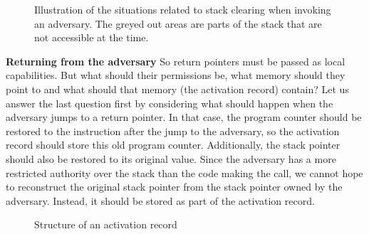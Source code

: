 \documentclass[format=acmsmall, review=true, screen=true]{acmart}
\newcommand{\plainperm}[1]{\textsc{#1}}
\newcommand{\entry}{\plainperm{e}}
\begin{document}
\begin{figure}[htb]
\begin{subfigure}{0.333\linewidth}
  \caption{}
  \label{fig:illu-adv-called}
  \end{subfigure}
  \caption{Illustration of the situations related to stack clearing when invoking an adversary.
    The greyed out areas are parts of the stack that are not accessible at the time.
  }
  \label{fig:invoke-adv}
\end{figure}


\textbf{Returning from the adversary} So return pointers must be passed as local
capabilities. But what should their permissions be, what memory should they
point to and what should that memory (the activation record) contain? Let us
answer the last question first by considering what should happen when the
adversary jumps to a return pointer. In that case, the program counter should be
restored to the instruction after the jump to the adversary, so the activation
record should store this old program counter. Additionally, the stack pointer
should also be restored to its original value. Since the adversary has a more
restricted authority over the stack than the code making the call, we cannot
hope to reconstruct the original stack pointer from the stack pointer owned by the
adversary. Instead, it should be stored as part of the activation record.

\begin{figure}[htb]
  
  \caption{Structure of an activation record}
  \label{fig:activ-rec-struct}
\end{figure}
\end{document}
